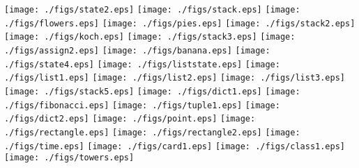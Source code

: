 \documentclass[10pt]{book}
\begin{document}
\newtheorem{exercise}{Esercizio}[chapter]
\setcounter{chapter}{-1}
\texttt{[image: ./figs/state2.eps]}
\clearpage%
\texttt{[image: ./figs/stack.eps]}
\clearpage%
\texttt{[image: ./figs/flowers.eps]}
\clearpage%
\texttt{[image: ./figs/pies.eps]}
\clearpage%
\texttt{[image: ./figs/stack2.eps]}
\clearpage%
\texttt{[image: ./figs/koch.eps]}
\clearpage%
\texttt{[image: ./figs/stack3.eps]}
\clearpage%
\texttt{[image: ./figs/assign2.eps]}
\clearpage%
\texttt{[image: ./figs/banana.eps]}
\clearpage%
\texttt{[image: ./figs/state4.eps]}
\clearpage%
\texttt{[image: ./figs/liststate.eps]}
\clearpage%
\texttt{[image: ./figs/list1.eps]}
\clearpage%
\texttt{[image: ./figs/list2.eps]}
\clearpage%
\texttt{[image: ./figs/list3.eps]}
\clearpage%
\texttt{[image: ./figs/stack5.eps]}
\clearpage%
\texttt{[image: ./figs/dict1.eps]}
\clearpage%
\texttt{[image: ./figs/fibonacci.eps]}
\clearpage%
\texttt{[image: ./figs/tuple1.eps]}
\clearpage%
\texttt{[image: ./figs/dict2.eps]}
\clearpage%
\texttt{[image: ./figs/point.eps]}
\clearpage%
\texttt{[image: ./figs/rectangle.eps]}
\clearpage%
\texttt{[image: ./figs/rectangle2.eps]}
\clearpage%
\texttt{[image: ./figs/time.eps]}
\clearpage%
\newcommand{\mymapsto}{$\mapsto$}
\texttt{[image: ./figs/card1.eps]}
\clearpage%
\texttt{[image: ./figs/class1.eps]}
\clearpage%
\texttt{[image: ./figs/towers.eps]}
\clearpage%
\end{document}

